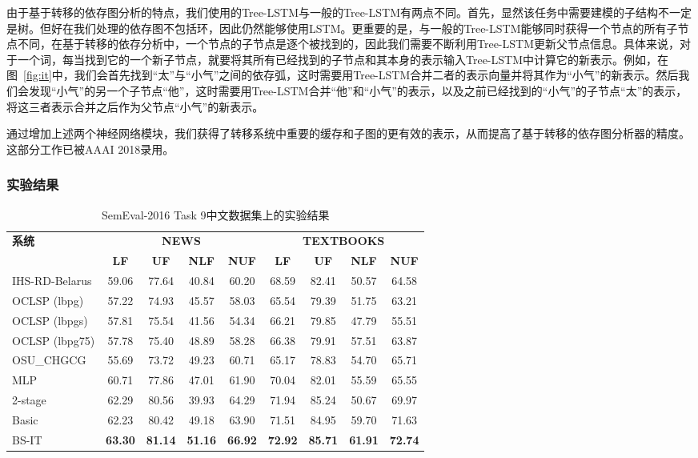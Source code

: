 由于基于转移的依存图分析的特点，我们使用的Tree-LSTM与一般的Tree-LSTM有两点不同。首先，显然该任务中需要建模的子结构不一定是树。但好在我们处理的依存图不包括环，因此仍然能够使用LSTM。更重要的是，与一般的Tree-LSTM能够同时获得一个节点的所有子节点不同，在基于转移的依存分析中，一个节点的子节点是逐个被找到的，因此我们需要不断利用Tree-LSTM更新父节点信息。具体来说，对于一个词，每当找到它的一个新子节点，就要将其所有已经找到的子节点和其本身的表示输入Tree-LSTM中计算它的新表示。例如，在图~\ref{fig:it}中，我们会首先找到“太”与“小气”之间的依存弧，这时需要用Tree-LSTM合并二者的表示向量并将其作为“小气”的新表示。然后我们会发现“小气”的另一个子节点“他”，这时需要用Tree-LSTM合并“他”和“小气”的表示，以及之前已经找到的“小气”的子节点“太”的表示，将这三者表示合并之后作为父节点“小气”的新表示。

通过增加上述两个神经网络模块，我们获得了转移系统中重要的缓存和子图的更有效的表示，从而提高了基于转移的依存图分析器的精度。这部分工作已被AAAI 2018录用。

\subsubsection{实验结果}

\begin{table}[htpb]
	\centering
	\begin{tabular}{l||cc|cc||cc|cc}
		\hline
		\multirow{2}{*}{\bf 系统}&\multicolumn{4}{c}{\bf NEWS}&\multicolumn{4}{c}{\bf TEXTBOOKS}\\
		\cline{2-9}
		&\bf LF&\bf UF&\bf NLF&\bf NUF&\bf LF&\bf UF&\bf NLF&\bf NUF\\
		\hline
		IHS-RD-Belarus&59.06&77.64&40.84&60.20&68.59&82.41&50.57&64.58\\
		OCLSP (lbpg)&57.22&74.93&45.57&58.03&65.54&79.39&51.75&63.21\\
		OCLSP (lbpgs)&57.81&75.54&41.56&54.34&66.21&79.85&47.79&55.51\\
		OCLSP (lbpg75)&57.78&75.40&48.89&58.28&66.38&79.91&57.51&63.87\\
		OSU\_CHGCG&55.69&73.72&49.23&60.71&65.17&78.83&54.70&65.71\\
		\hline
		MLP & 60.71&77.86&47.01&61.90&70.04&82.01&55.59&65.55 \\ 
		\hline
		2-stage & 62.29&80.56&39.93&64.29&71.94&85.24&50.67&69.97 \\ 
		\hline
		Basic&62.23&80.42&49.18&63.90&71.51&84.95&59.70&71.63\\
		BS-IT&\bf63.30&\bf81.14&\bf51.16&\bf66.92&\bf72.92&\bf85.71&\bf61.91&\bf72.74\\
		\hline
	\end{tabular}
	\caption{SemEval-2016 Task 9中文数据集上的实验结果}
	\label{tbl:result-semeval16}
	\vspace{-0.3em}
\end{table}


